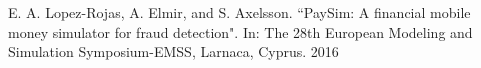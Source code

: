 \documentclass[letterpaper,12pt]{article}
\begin{document}

\begin{thebibliography}{99}

E. A. Lopez-Rojas, A. Elmir, and S. Axelsson. ``PaySim: A financial mobile money simulator for fraud detection". In: The 28th European Modeling and Simulation Symposium-EMSS, Larnaca, Cyprus. 2016



\end{thebibliography}
\end{document}
